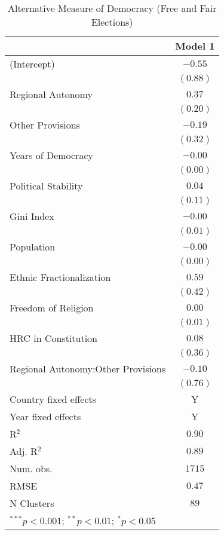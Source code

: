
\begin{table}[!htbp]
\begin{center}
\begin{tabular}{l c}
\hline
 & Model 1 \\
\hline
(Intercept)                        & $-0.55$  \\
                                   & $(0.88)$ \\
Regional Autonomy                  & $0.37$   \\
                                   & $(0.20)$ \\
Other Provisions                   & $-0.19$  \\
                                   & $(0.32)$ \\
Years of Democracy                 & $-0.00$  \\
                                   & $(0.00)$ \\
Political Stability                & $0.04$   \\
                                   & $(0.11)$ \\
Gini Index                         & $-0.00$  \\
                                   & $(0.01)$ \\
Population                         & $-0.00$  \\
                                   & $(0.00)$ \\
Ethnic Fractionalization           & $0.59$   \\
                                   & $(0.42)$ \\
Freedom of Religion                & $0.00$   \\
                                   & $(0.01)$ \\
HRC in Constitution                & $0.08$   \\
                                   & $(0.36)$ \\
Regional Autonomy:Other Provisions & $-0.10$  \\
                                   & $(0.76)$ \\
\hline
Country fixed effects              & Y        \\
Year fixed effects                 & Y        \\
R$^2$                              & $0.90$   \\
Adj. R$^2$                         & $0.89$   \\
Num. obs.                          & $1715$   \\
RMSE                               & $0.47$   \\
N Clusters                         & $89$     \\
\hline
\multicolumn{2}{l}{\scriptsize{$^{***}p<0.001$; $^{**}p<0.01$; $^{*}p<0.05$}}
\end{tabular}
\caption{Alternative Measure of Democracy (Free and Fair Elections)}
\label{table:coefficients}
\end{center}
\end{table}
